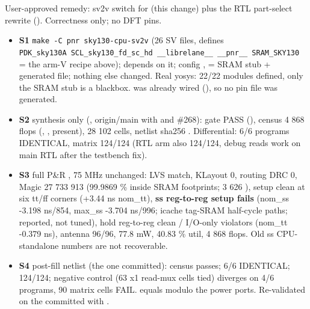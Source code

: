 \begin{record}

User-approved remedy: sv2v switch for  (this change)
plus the RTL part-select rewrite (). Correctness only; no DFT
pins.

\begin{itemize}
\tightlist
\item
  \textbf{S1}
  \texttt{make\ -\allowbreak{}C\ pnr\ sky130-\allowbreak{}cpu-\allowbreak{}sv2v}
  (26 SV files, defines
  \texttt{PDK\_\allowbreak{}sky130A\ SCL\_\allowbreak{}sky130\_\allowbreak{}fd\_\allowbreak{}sc\_\allowbreak{}hd\ \_\allowbreak{}\_\allowbreak{}librelane\_\allowbreak{}\_\allowbreak{}\ \_\allowbreak{}\_\allowbreak{}pnr\_\allowbreak{}\_\allowbreak{}\ SRAM\_\allowbreak{}SKY130}
  = the arm-V recipe above);  depends on it;
  config ,  = SRAM stub +
  generated file; nothing else changed. Real yosys: 22/22 modules
  defined, only the SRAM stub is a blackbox.  was
  already wired (), so no pin file was generated.
\item
  \textbf{S2} synthesis only (,
  origin/\allowbreak{}main  with  and \#268): gate
  PASS (), census 4 868 flops (,
  ,  present), 28 102 cells,
  netlist sha256 . Differential: 6/6 programs
  IDENTICAL, matrix 124/124 (RTL arm also 124/124, debug reads work on
  main RTL after the testbench fix).
\item
  \textbf{S3} full P\&R , 75 MHz
  unchanged: LVS match, KLayout 0, routing DRC 0, Magic 27 733 913
  (99.9869 \% inside SRAM footprints; 3 626 ), setup clean
  at six tt/ff corners (+3.44 ns nom\_tt), \textbf{ss reg-to-reg setup
  fails} (nom\_ss -3.198 ns/854, max\_ss -3.704 ns/996; icache tag-SRAM
  half-cycle paths; reported, not tuned), hold reg-to-reg clean /
  I/O-only violators (nom\_tt -0.379 ns), antenna 96/96, 77.8 mW, 40.83
  \% util, 4 868 flops. Old ss CPU-standalone numbers are not
  recoverable.
\item
  \textbf{S4} post-fill netlist (the one committed): census passes; 6/6
  IDENTICAL; 124/124; negative control (63 x1 read-mux cells tied)
  diverges on 4/6 programs, 90 matrix cells FAIL.  equals
   modulo the power ports. Re-validated on the committed
   with
  .

\end{itemize}
\end{record}

